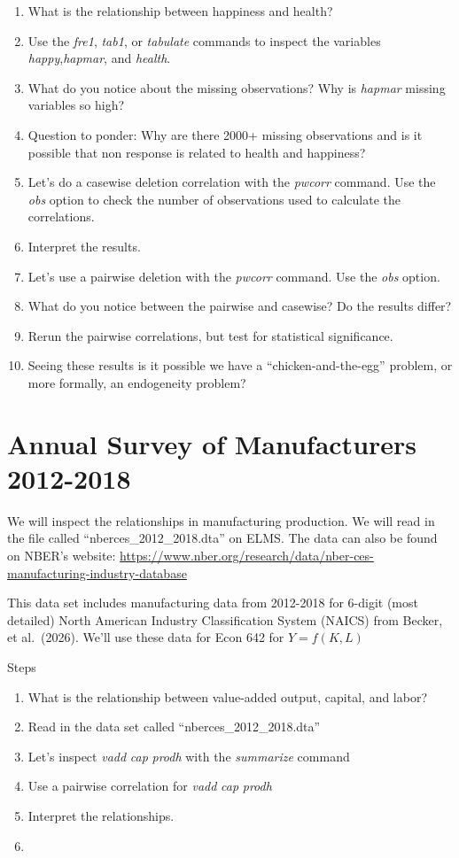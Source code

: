 \documentclass[
]{book}
\providecommand{\tightlist}{%
  \setlength{\itemsep}{0pt}\setlength{\parskip}{0pt}}
\begin{document}
\begin{enumerate}
\def\labelenumi{\arabic{enumi}.}
\tightlist
\item
  What is the relationship between happiness and health?
\item
  Use the \emph{fre1}, \emph{tab1}, or \emph{tabulate} commands to inspect the variables \emph{happy},\emph{hapmar}, and \emph{health}.
\item
  What do you notice about the missing observations? Why is \emph{hapmar} missing variables so high?
\item
  Question to ponder: Why are there 2000+ missing observations and is it possible that non response is related to health and happiness?
\item
  Let's do a casewise deletion correlation with the \emph{pwcorr} command. Use the \emph{obs} option to check the number of observations used to calculate the correlations.
\item
  Interpret the results.
\item
  Let's use a pairwise deletion with the \emph{pwcorr} command. Use the \emph{obs} option.
\item
  What do you notice between the pairwise and casewise? Do the results differ?
\item
  Rerun the pairwise correlations, but test for statistical significance.
\item
  Seeing these results is it possible we have a ``chicken-and-the-egg'' problem, or more formally, an endogeneity problem?
\end{enumerate}

\section{Annual Survey of Manufacturers 2012-2018}\label{annual-survey-of-manufacturers-2012-2018}

We will inspect the relationships in manufacturing production. We will read in the file called ``nberces\_2012\_2018.dta'' on ELMS. The data can also be found on NBER's website: \url{https://www.nber.org/research/data/nber-ces-manufacturing-industry-database}

This data set includes manufacturing data from 2012-2018 for 6-digit (most detailed) North American Industry Classification System (NAICS) from Becker, et al.~(2026). We'll use these data for Econ 642 for \(Y = f(K,L)\)

Steps

\begin{enumerate}
\def\labelenumi{\arabic{enumi}.}
\tightlist
\item
  What is the relationship between value-added output, capital, and labor?
\item
  Read in the data set called ``nberces\_2012\_2018.dta''
\item
  Let's inspect \emph{vadd} \emph{cap} \emph{prodh} with the \emph{summarize} command
\item
  Use a pairwise correlation for \emph{vadd} \emph{cap} \emph{prodh}
\item
  Interpret the relationships.
\item
\end{enumerate}
\end{document}
